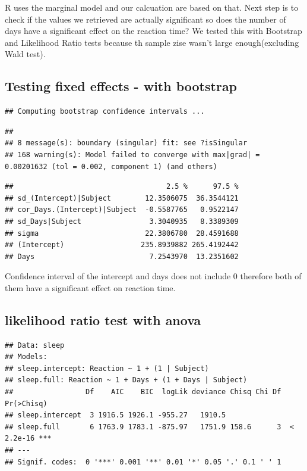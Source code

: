 \documentclass[
]{article}
\begin{document}
R uses the marginal model and our calcuation are based on that. Next
step is to check if the values we retrieved are actually significant so
does the number of days have a significant effect on the reaction time?
We tested this with Bootstrap and Likelihood Ratio tests because th
sample zise wasn't large enough(excluding Wald test).

\hypertarget{testing-fixed-effects---with-bootstrap}{%
\subsection{Testing fixed effects - with
bootstrap}\label{testing-fixed-effects---with-bootstrap}}

\begin{verbatim}
## Computing bootstrap confidence intervals ...
\end{verbatim}

\begin{verbatim}
## 
## 8 message(s): boundary (singular) fit: see ?isSingular
## 168 warning(s): Model failed to converge with max|grad| = 0.00201632 (tol = 0.002, component 1) (and others)
\end{verbatim}

\begin{verbatim}
##                                    2.5 %      97.5 %
## sd_(Intercept)|Subject        12.3506075  36.3544121
## cor_Days.(Intercept)|Subject  -0.5587765   0.9522147
## sd_Days|Subject                3.3040935   8.3389309
## sigma                         22.3806780  28.4591688
## (Intercept)                  235.8939882 265.4192442
## Days                           7.2543970  13.2351602
\end{verbatim}

Confidence interval of the intercept and days does not include 0
therefore both of them have a significant effect on reaction time.

\hypertarget{likelihood-ratio-test-with-anova}{%
\subsection{likelihood ratio test with
anova}\label{likelihood-ratio-test-with-anova}}

\begin{verbatim}
## Data: sleep
## Models:
## sleep.intercept: Reaction ~ 1 + (1 | Subject)
## sleep.full: Reaction ~ 1 + Days + (1 + Days | Subject)
##                 Df    AIC    BIC  logLik deviance Chisq Chi Df Pr(>Chisq)    
## sleep.intercept  3 1916.5 1926.1 -955.27   1910.5                            
## sleep.full       6 1763.9 1783.1 -875.97   1751.9 158.6      3  < 2.2e-16 ***
## ---
## Signif. codes:  0 '***' 0.001 '**' 0.01 '*' 0.05 '.' 0.1 ' ' 1
\end{verbatim}
\end{document}
